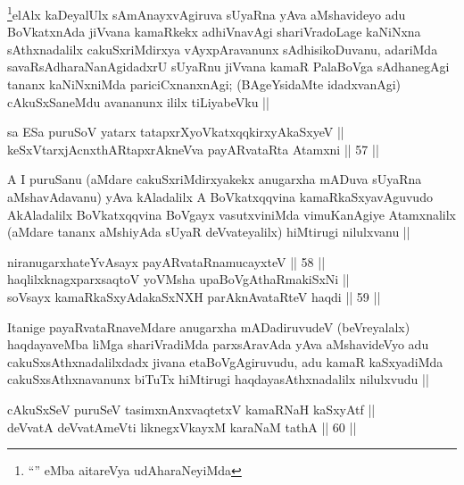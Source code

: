 \begin{artha}
\footnote{``\stext'' eMba aitareVya udAharaNeyiMda}elAlx kaDeyalUlx sAmAnayxvAgiruva sUyaRna yAva aMshavideyo
adu BoVkatxnAda jiVvana kamaRkekx adhiVnavAgi shariVradoLage kaNiNxna
sAthxnadalilx cakuSxriMdirxya vAyxpAravanunx sAdhisikoDuvanu, adariMda
savaRsAdharaNanAgidadxrU sUyaRnu jiVvana kamaR PalaBoVga sAdhanegAgi
tananx kaNiNxniMda pariciCxnanxnAgi; (BAgeYsidaMte idadxvanAgi)
cAkuSxSaneMdu avananunx ililx tiLiyabeVku ||
\end{artha}


\begin{shl}
sa ESa puruSoV yatarx tatapxrXyoVkatxqqkirxyAkaSxyeV || \\
keSxVtarxjAcnxthARtapxrAkneVva payARvataRta Atamxni ||  57 ||  
\end{shl}

\begin{artha}
A I puruSanu (aMdare cakuSxriMdirxyakekx anugarxha mADuva sUyaRna aMshavAdavanu)
yAva kAladalilx A BoVkatxqqvina kamaRkaSxyavAguvudo
AkAladalilx BoVkatxqqvina BoVgayx vasutxviniMda vimuKanAgiye
Atamxnalilx (aMdare tananx aMshiyAda sUyaR deVvateyalilx) hiMtirugi
nilulxvanu ||
\end{artha}


\begin{shl}
niranugarxhateYvAsayx payARvataRnamucayxteV ||  58 ||  \\
haqlilxknagxparxsaqtoV yoVM\s sha upaBoVgAthaRmakiSxNi || \\
soV\s sayx kamaRkaSxyAdakaSxNXH parAknAvataRteV haqdi ||  59 ||  
\end{shl}

\begin{artha}
Itanige payaRvataRnaveMdare anugarxha mADadiruvudeV (beVreyalalx)
haqdayaveMba liMga shariVradiMda parxsAravAda yAva aMshavideVyo adu
cakuSxsAthxnadalilxdadx jivana etaBoVgAgiruvudu, adu kamaR kaSxyadiMda
cakuSxsAthxnavanunx biTuTx hiMtirugi haqdayasAthxnadalilx nilulxvudu ||
\end{artha}


\begin{shl}
cAkuSxSeV puruSeV tasimxnAnxvaqtetxV kamaRNaH kaSxyAtf || \\
deVvatA deVvatAmeVti liknegxVkayxM karaNaM tathA ||  60 ||  
\end{shl}

